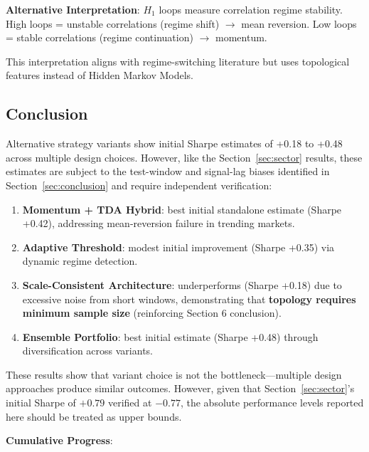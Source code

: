 \textbf{Alternative Interpretation}: $H_1$ loops measure correlation regime stability. High loops = unstable correlations (regime shift) $\rightarrow$ mean reversion. Low loops = stable correlations (regime continuation) $\rightarrow$ momentum.

This interpretation aligns with regime-switching literature \citep{Hamilton1989, Ang2002} but uses topological features instead of Hidden Markov Models.

\subsection{Conclusion}

Alternative strategy variants show initial Sharpe estimates of +0.18 to +0.48 across multiple design choices. However, like the Section~\ref{sec:sector} results, these estimates are subject to the test-window and signal-lag biases identified in Section~\ref{sec:conclusion} and require independent verification:

\begin{enumerate}
\item \textbf{Momentum + TDA Hybrid}: best initial standalone estimate (Sharpe +0.42), addressing mean-reversion failure in trending markets.

\item \textbf{Adaptive Threshold}: modest initial improvement (Sharpe +0.35) via dynamic regime detection.

\item \textbf{Scale-Consistent Architecture}: underperforms (Sharpe +0.18) due to excessive noise from short windows, demonstrating that \textbf{topology requires minimum sample size} (reinforcing Section 6 conclusion).

\item \textbf{Ensemble Portfolio}: best initial estimate (Sharpe +0.48) through diversification across variants.
\end{enumerate}

These results show that variant choice is not the bottleneck---multiple design approaches produce similar outcomes. However, given that Section~\ref{sec:sector}'s initial Sharpe of $+0.79$ verified at $-0.77$, the absolute performance levels reported here should be treated as upper bounds.

\textbf{Cumulative Progress}:

